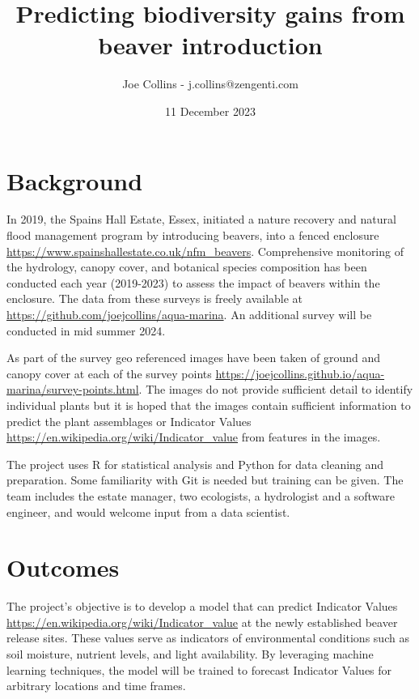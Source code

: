 \documentclass{roles}
\title{Predicting biodiversity gains from beaver introduction}
\author{Joe Collins - j.collins@zengenti.com}
\date{11 December 2023}
\begin{document}
\maketitle

\section*{Background}

In 2019, the Spains Hall Estate, Essex,
initiated a nature recovery and natural flood management program by introducing beavers,
into a fenced enclosure
\href{https://www.spainshallestate.co.uk/nfm\_beavers}{https://www.spainshallestate.co.uk/nfm\_beavers}.
Comprehensive monitoring of
the hydrology, canopy cover, and botanical species composition
has been conducted each year (2019-2023)
to assess the impact of beavers within the enclosure.
The data from these surveys is freely available at
\href{https://github.com/joejcollins/aqua-marina}{https://github.com/joejcollins/aqua-marina}.
An additional survey will be conducted in mid summer 2024.

As part of the survey geo referenced images have been taken
of ground and canopy cover at each of the survey points
\href{https://joejcollins.github.io/aqua-marina/survey-points.html}{https://joejcollins.github.io/aqua-marina/survey-points.html}.
The images do not provide sufficient detail to identify individual plants
but it is hoped that the images contain sufficient information to predict
the plant assemblages or Indicator Values
\href{https://en.wikipedia.org/wiki/Indicator\_value}{https://en.wikipedia.org/wiki/Indicator\_value}
from features in the images.

The project uses R for statistical analysis and Python for data cleaning and preparation.
Some familiarity with Git is needed but training can be given.
The team includes the estate manager, two ecologists, a hydrologist and a software engineer,
and would welcome input from a data scientist.
\section*{Outcomes}

The project's objective is to develop a model
that can predict Indicator Values
\href{https://en.wikipedia.org/wiki/Indicator\_value}{https://en.wikipedia.org/wiki/Indicator\_value}
at the newly established beaver release sites.
These values serve as indicators of environmental conditions such as
soil moisture, nutrient levels, and light availability.
By leveraging machine learning techniques,
the model will be trained to forecast Indicator Values for arbitrary locations and time frames.
\end{document}
